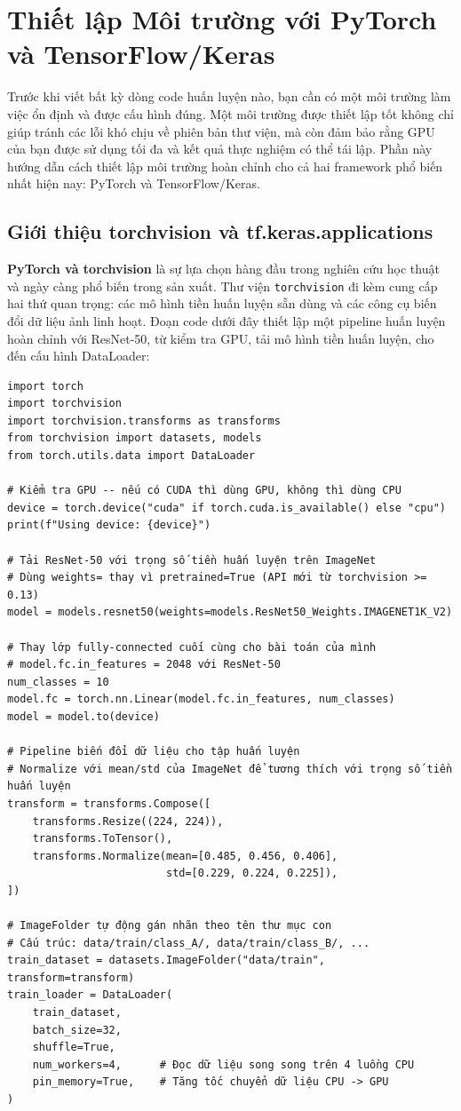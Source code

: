 \section{Thiết lập Môi trường với PyTorch và TensorFlow/Keras}
\label{sec:env_setup}

Trước khi viết bất kỳ dòng code huấn luyện nào, bạn cần có một môi trường làm việc ổn định và được cấu hình đúng. Một môi trường được thiết lập tốt không chỉ giúp tránh các lỗi khó chịu về phiên bản thư viện, mà còn đảm bảo rằng GPU của bạn được sử dụng tối đa và kết quả thực nghiệm có thể tái lập. Phần này hướng dẫn cách thiết lập môi trường hoàn chỉnh cho cả hai framework phổ biến nhất hiện nay: PyTorch và TensorFlow/Keras.

\subsection{Giới thiệu torchvision và tf.keras.applications}
\label{subsec:torchvision_keras}

\textbf{PyTorch và torchvision} là sự lựa chọn hàng đầu trong nghiên cứu học thuật và ngày càng phổ biến trong sản xuất. Thư viện \texttt{torchvision} đi kèm cung cấp hai thứ quan trọng: các mô hình tiền huấn luyện sẵn dùng và các công cụ biến đổi dữ liệu ảnh linh hoạt. Đoạn code dưới đây thiết lập một pipeline huấn luyện hoàn chỉnh với ResNet-50, từ kiểm tra GPU, tải mô hình tiền huấn luyện, cho đến cấu hình DataLoader:

\begin{verbatim}
import torch
import torchvision
import torchvision.transforms as transforms
from torchvision import datasets, models
from torch.utils.data import DataLoader

# Kiểm tra GPU -- nếu có CUDA thì dùng GPU, không thì dùng CPU
device = torch.device("cuda" if torch.cuda.is_available() else "cpu")
print(f"Using device: {device}")

# Tải ResNet-50 với trọng số tiền huấn luyện trên ImageNet
# Dùng weights= thay vì pretrained=True (API mới từ torchvision >= 0.13)
model = models.resnet50(weights=models.ResNet50_Weights.IMAGENET1K_V2)

# Thay lớp fully-connected cuối cùng cho bài toán của mình
# model.fc.in_features = 2048 với ResNet-50
num_classes = 10
model.fc = torch.nn.Linear(model.fc.in_features, num_classes)
model = model.to(device)

# Pipeline biến đổi dữ liệu cho tập huấn luyện
# Normalize với mean/std của ImageNet để tương thích với trọng số tiền huấn luyện
transform = transforms.Compose([
    transforms.Resize((224, 224)),
    transforms.ToTensor(),
    transforms.Normalize(mean=[0.485, 0.456, 0.406],
                         std=[0.229, 0.224, 0.225]),
])

# ImageFolder tự động gán nhãn theo tên thư mục con
# Cấu trúc: data/train/class_A/, data/train/class_B/, ...
train_dataset = datasets.ImageFolder("data/train", transform=transform)
train_loader = DataLoader(
    train_dataset,
    batch_size=32,
    shuffle=True,
    num_workers=4,      # Đọc dữ liệu song song trên 4 luồng CPU
    pin_memory=True,    # Tăng tốc chuyển dữ liệu CPU -> GPU
)
\end{verbatim}

